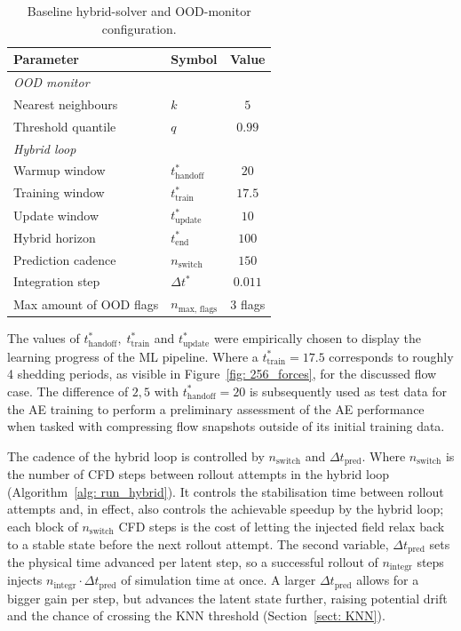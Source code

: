\begin{table}[H]
    \centering
    \begin{tabular}{@{}llc@{}}
        \toprule
        Parameter & Symbol & Value \\
        \midrule
        \multicolumn{3}{l}{\textit{OOD monitor}} \\
        Nearest neighbours        & $k$       & $5$ \\
        Threshold quantile        & $q$       & $0.99$ \\
        \midrule
        \multicolumn{3}{l}{\textit{Hybrid loop}} \\
        Warmup window   & $t_\text{handoff}^*$ & $20$ \\
        Training window & $t_\text{train}^*$     & $17.5$ \\ %
        Update window   & $t_\text{update}^*$    & $10$ \\
        Hybrid horizon            & $t_\text{end}^*$     & $100$ \\
        Prediction cadence        & $n_\text{switch}$       & $150$  \\
        Integration step          & $\Delta t^*$ & $0.011$ \\
        Max amount of OOD flags   & $n_\text{max, flags}$        & $3$ flags \\
        \bottomrule
    \end{tabular}
     \caption{Baseline hybrid-solver and OOD-monitor configuration.}
    \label{tab: 4_hybrid_config}
\end{table}

The values of $t^*_\text{handoff}, \; t^*_\text{train}$ and $ t^*_\text{update}$ were empirically chosen to display the learning progress of the ML pipeline. Where a $t^*_\text{train} = 17.5$ corresponds to roughly 4 shedding periods, as visible in Figure~\ref{fig: 256_forces}, for the discussed flow case. The difference of $2,5$ with $t^*_\text{handoff} = 20$ is subsequently used as test data for the AE training to perform a preliminary assessment of the AE performance when tasked with compressing flow snapshots outside of its initial training data. 

The cadence of the hybrid loop is controlled by $n_\text{switch}$ and $\Delta t_\text{pred}$. Where $n_\text{switch}$ is the number of CFD steps between rollout attempts in the hybrid loop (Algorithm~\ref{alg: run_hybrid}). It controls the stabilisation time between rollout attempts and, in effect, also controls the achievable speedup by the hybrid loop; each block of $n_\text{switch}$ CFD steps is the cost of letting the injected field relax back to a stable state before the next rollout attempt. The second variable, $\Delta t_\text{pred}$ sets the physical time advanced per latent step, so a successful rollout of $n_\text{integr}$ steps injects $n_\text{integr}\!\cdot\!\Delta t_\text{pred}$ of simulation time at once. A larger $\Delta t_\text{pred}$ allows for a bigger gain per step, but advances the latent state further, raising potential drift and the chance of crossing the KNN threshold (Section~\ref{sect: KNN}). 

